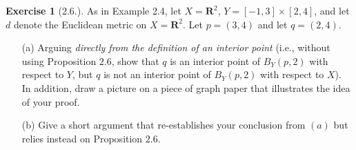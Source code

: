 \documentclass[10pt,reqno]{amsart}
\theoremstyle{definition}
\newtheorem{exercise}{Exercise}[section]
\newcommand{\rr}{\mathbf R}
\begin{document}
\begin{exercise}[2.6.]
	As in Example 2.4, let $X = \rr^2$, $Y = [-1, 3] \times [2,4]$, and let $d$ denote the Euclidean metric on $X = \rr^2$. Let $p = (3,4)$ and let $q = (2,4)$.
	\begin{itemize}
		\item [(a)] Arguing \textit{directly from the definition of an interior point} (i.e., without using Proposition $2.6$, show that $q$ is an interior point of $B_Y (p, 2)$ with respect to $Y$, but $q$ is not an interior point of $B_Y (p, 2)$ with respect to $X$). In addition, draw a picture on a piece of graph paper that illustrates the idea of your proof.
		\item [(b)] Give a short argument that re-establishes your conclusion from $(a)$ but relies instead on Proposition $2.6$.
	\end{itemize}
\end{exercise}
\end{document}
